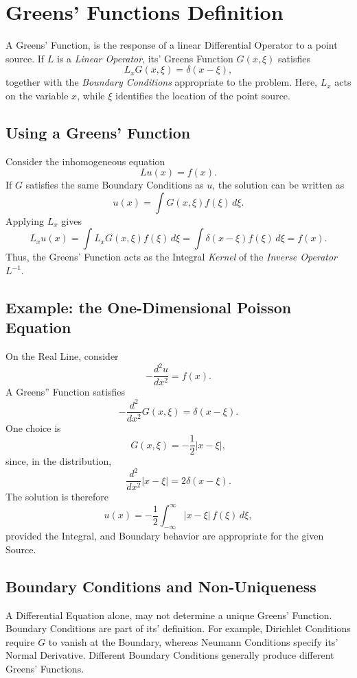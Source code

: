 \documentclass[a4paper, 10pt, onepage]{elegantbook}
\begin{document}
{\begin{tikzpicture}[>=stealth, scale=1.3]
\end{tikzpicture}





\section{Greens' Functions Definition}

A Greens' Function, is the response of a linear Differential Operator to a point source. If \(L\) is a \emph{Linear 
Operator}, its' Greens Function
\(G(x,\xi)\) satisfies
\[
L_x G(x,\xi)=\delta(x-\xi),
\]
together with the \emph{Boundary Conditions} appropriate to the problem. Here, \(L_x\) acts on the variable \(x\), 
while \(\xi\) identifies the
location of the point source.

\subsection{Using a Greens' Function}

Consider the inhomogeneous equation
\[
L u(x)=f(x).
\]
If \(G\) satisfies the same Boundary Conditions as \(u\), the solution can be written as
\[
u(x)=\int G(x,\xi)f(\xi)\,d\xi.
\]
Applying \(L_x\) gives
\[
L_xu(x)
=\int L_xG(x,\xi)f(\xi)\,d\xi
=\int\delta(x-\xi)f(\xi)\,d\xi
=f(x).
\]
Thus, the Greens' Function acts as the Integral \emph{Kernel} of the \emph{Inverse
Operator} \(L^{-1}\).

\subsection{Example: the One-Dimensional Poisson Equation}

On the Real Line, consider
\[
-\frac{d^2u}{dx^2}=f(x).
\]
A Greens'' Function satisfies
\[
-\frac{d^2}{dx^2}G(x,\xi)=\delta(x-\xi).
\]
One choice is
\[
G(x,\xi)=-\frac{1}{2}|x-\xi|,
\]
since, in the distribution,
\[
\frac{d^2}{dx^2}|x-\xi|=2\delta(x-\xi).
\]
The solution is therefore
\[
u(x)=-\frac{1}{2}\int_{-\infty}^{\infty}
|x-\xi|\,f(\xi)\,d\xi,
\]
provided the Integral, and Boundary behavior are appropriate for the given Source.

\subsection{Boundary Conditions and Non-Uniqueness}

A Differential Equation alone, may not determine a unique Greens' Function. Boundary Conditions are part of its' 
definition. For example, Dirichlet Conditions require \(G\) to vanish at the Boundary, whereas Neumann Conditions 
specify its' Normal Derivative. Different Boundary Conditions generally produce different Greens' Functions.

}
\end{document}
